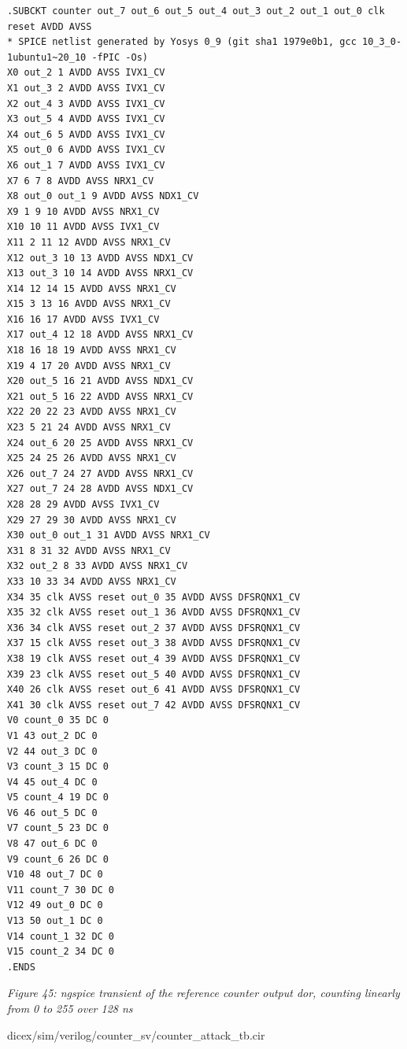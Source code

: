 \begin{verbatim}
.SUBCKT counter out_7 out_6 out_5 out_4 out_3 out_2 out_1 out_0 clk reset AVDD AVSS
* SPICE netlist generated by Yosys 0_9 (git sha1 1979e0b1, gcc 10_3_0-1ubuntu1~20_10 -fPIC -Os)
X0 out_2 1 AVDD AVSS IVX1_CV
X1 out_3 2 AVDD AVSS IVX1_CV
X2 out_4 3 AVDD AVSS IVX1_CV
X3 out_5 4 AVDD AVSS IVX1_CV
X4 out_6 5 AVDD AVSS IVX1_CV
X5 out_0 6 AVDD AVSS IVX1_CV
X6 out_1 7 AVDD AVSS IVX1_CV
X7 6 7 8 AVDD AVSS NRX1_CV
X8 out_0 out_1 9 AVDD AVSS NDX1_CV
X9 1 9 10 AVDD AVSS NRX1_CV
X10 10 11 AVDD AVSS IVX1_CV
X11 2 11 12 AVDD AVSS NRX1_CV
X12 out_3 10 13 AVDD AVSS NDX1_CV
X13 out_3 10 14 AVDD AVSS NRX1_CV
X14 12 14 15 AVDD AVSS NRX1_CV
X15 3 13 16 AVDD AVSS NRX1_CV
X16 16 17 AVDD AVSS IVX1_CV
X17 out_4 12 18 AVDD AVSS NRX1_CV
X18 16 18 19 AVDD AVSS NRX1_CV
X19 4 17 20 AVDD AVSS NRX1_CV
X20 out_5 16 21 AVDD AVSS NDX1_CV
X21 out_5 16 22 AVDD AVSS NRX1_CV
X22 20 22 23 AVDD AVSS NRX1_CV
X23 5 21 24 AVDD AVSS NRX1_CV
X24 out_6 20 25 AVDD AVSS NRX1_CV
X25 24 25 26 AVDD AVSS NRX1_CV
X26 out_7 24 27 AVDD AVSS NRX1_CV
X27 out_7 24 28 AVDD AVSS NDX1_CV
X28 28 29 AVDD AVSS IVX1_CV
X29 27 29 30 AVDD AVSS NRX1_CV
X30 out_0 out_1 31 AVDD AVSS NRX1_CV
X31 8 31 32 AVDD AVSS NRX1_CV
X32 out_2 8 33 AVDD AVSS NRX1_CV
X33 10 33 34 AVDD AVSS NRX1_CV
X34 35 clk AVSS reset out_0 35 AVDD AVSS DFSRQNX1_CV
X35 32 clk AVSS reset out_1 36 AVDD AVSS DFSRQNX1_CV
X36 34 clk AVSS reset out_2 37 AVDD AVSS DFSRQNX1_CV
X37 15 clk AVSS reset out_3 38 AVDD AVSS DFSRQNX1_CV
X38 19 clk AVSS reset out_4 39 AVDD AVSS DFSRQNX1_CV
X39 23 clk AVSS reset out_5 40 AVDD AVSS DFSRQNX1_CV
X40 26 clk AVSS reset out_6 41 AVDD AVSS DFSRQNX1_CV
X41 30 clk AVSS reset out_7 42 AVDD AVSS DFSRQNX1_CV
V0 count_0 35 DC 0
V1 43 out_2 DC 0
V2 44 out_3 DC 0
V3 count_3 15 DC 0
V4 45 out_4 DC 0
V5 count_4 19 DC 0
V6 46 out_5 DC 0
V7 count_5 23 DC 0
V8 47 out_6 DC 0
V9 count_6 26 DC 0
V10 48 out_7 DC 0
V11 count_7 30 DC 0
V12 49 out_0 DC 0
V13 50 out_1 DC 0
V14 count_1 32 DC 0
V15 count_2 34 DC 0
.ENDS
\end{verbatim}


{
\centering
{}
}

\emph{Figure 45: ngspice transient of the reference counter output dor,
counting linearly from 0 to 255 over 128 ns}

dicex/sim/verilog/counter\_sv/counter\_attack\_tb.cir

\begin{Shaded}
\begin{Highlighting}[]
   
\end{Highlighting}
\end{Shaded}


